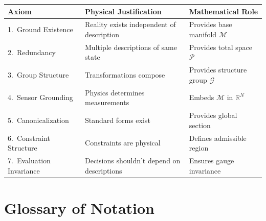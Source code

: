\documentclass[11pt]{article}
\begin{document}
\begin{table}[h]
\centering
\begin{tabular}{@{}p{2.5cm}p{4.5cm}p{4.5cm}@{}}
\toprule
\textbf{Axiom} & \textbf{Physical Justification} & \textbf{Mathematical Role} \\
\midrule
1.\ Ground Existence & Reality exists independent of description & Provides base manifold $\mathcal{M}$ \\
2.\ Redundancy & Multiple descriptions of same state & Provides total space $\mathcal{P}$ \\
3.\ Group Structure & Transformations compose & Provides structure group $\mathcal{G}$ \\
4.\ Sensor Grounding & Physics determines measurements & Embeds $\mathcal{M}$ in $\mathbb{R}^N$ \\
5.\ Canonicalization & Standard forms exist & Provides global section \\
6.\ Constraint Structure & Constraints are physical & Defines admissible region \\
7.\ Evaluation Invariance & Decisions shouldn't depend on descriptions & Ensures gauge invariance \\
\bottomrule
\end{tabular}
\end{table}

\section{Glossary of Notation}
\end{document}
